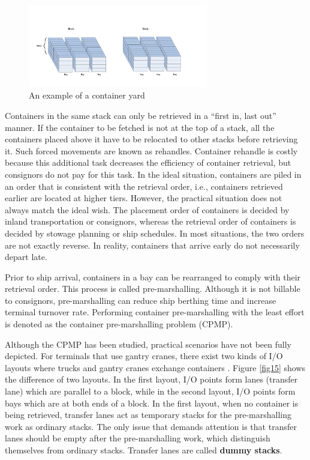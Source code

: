 \documentclass[review,3p,times,authoryear,12pt]{elsarticle}
\begin{document}
\begin{figure}[!htb]
\centering
\includegraphics[width=0.7\textwidth]{fig1.pdf}
\caption{An example of a container yard}
\label{fig:1}
\end{figure}

Containers in the same stack can only be retrieved in a ``first in, last out'' manner.
If the container to be fetched is not at the top of a stack, all the containers placed above it have to be relocated to other stacks before retrieving it.
Such forced movements are known as rehandles.
Container rehandle is costly because this additional task decreases the efficiency of container retrieval, but consignors do not pay for this task.
In the ideal situation, containers are piled in an order that is consistent with the retrieval order, i.e., containers retrieved earlier are located at higher tiers.
However, the practical situation does not always match the ideal wish.
The placement order of containers is decided by inland transportation or consignors, whereas the retrieval order of containers is decided by stowage planning or ship schedules. In most situations, the two orders are not exactly reverse. In reality, containers that arrive early do not necessarily depart late.

Prior to ship arrival, containers in a bay can be rearranged to comply with their retrieval order.
This process is called pre-marshalling.
Although it is not billable to consignors, pre-marshalling can reduce ship berthing time and increase terminal turnover rate.
Performing container pre-marshalling with the least effort is denoted as the container pre-marshalling problem (CPMP).

Although the CPMP has been studied, practical scenarios have not been fully depicted.
For terminals that use gantry cranes, there exist two kinds of I/O layouts where trucks and gantry cranes exchange containers \citep{Carlo2014}.
Figure \ref{fig15} shows the difference of two layouts.
In the first layout, I/O points form lanes (transfer lane) which are parallel to a block, while in the second layout, I/O points form bays which are at both ends of a block.
In the first layout, when no container is being retrieved, transfer lanes act as temporary stacks for the pre-marshalling work as ordinary stacks.
The only issue that demands attention is that transfer lanes should be empty after the pre-marshalling work, which distinguish themselves from ordinary stacks.
Transfer lanes are called \textbf{dummy stacks}.
\end{document}
